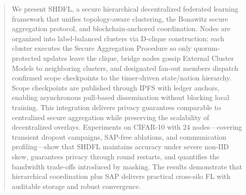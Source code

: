 \begin{abstract}
We present SHDFL, a secure hierarchical decentralized federated learning framework that unifies topology-aware clustering, the Bonawitz secure aggregation protocol, and blockchain-anchored coordination. Nodes are organized into label-balanced clusters via D-clique construction; each cluster executes the Secure Aggregation Procedure so only quorum-protected updates leave the clique, bridge nodes gossip External Cluster Models to neighboring clusters, and designated fan-out members dispatch confirmed scope checkpoints to the timer-driven state/nation hierarchy. Scope checkpoints are published through IPFS with ledger anchors, enabling asynchronous pull-based dissemination without blocking local training. This integration delivers privacy guarantees comparable to centralized secure aggregation while preserving the scalability of decentralized overlays. Experiments on CIFAR-10 with 24 nodes—covering transient dropout campaigns, SAP-free ablations, and communication profiling—show that SHDFL maintains accuracy under severe non-IID skew, guarantees privacy through round restarts, and quantifies the bandwidth trade-offs introduced by masking. The results demonstrate that hierarchical coordination plus SAP delivers practical cross-silo FL with auditable storage and robust convergence.
\end{abstract}
